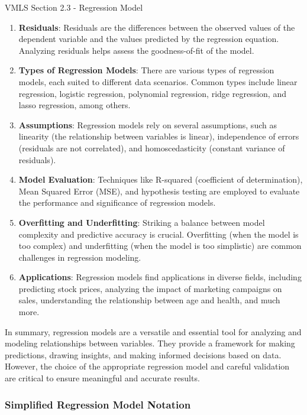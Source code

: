 \begin{notes}{VMLS Section 2.3 - Regression Model}
\begin{enumerate}
        \item \textbf{Residuals}: Residuals are the differences between the observed values of the dependent variable and the values predicted by the regression equation. Analyzing residuals helps assess the goodness-of-fit of the model.
        
        \item \textbf{Types of Regression Models}: There are various types of regression models, each suited to different data scenarios. Common types include linear regression, logistic regression, polynomial regression, ridge regression, and 
        lasso regression, among others.
        
        \item \textbf{Assumptions}: Regression models rely on several assumptions, such as linearity (the relationship between variables is linear), independence of errors (residuals are not correlated), and homoscedasticity (constant variance of residuals).
        
        \item \textbf{Model Evaluation}: Techniques like R-squared (coefficient of determination), Mean Squared Error (MSE), and hypothesis testing are employed to evaluate the performance and significance of regression models.
        
        \item \textbf{Overfitting and Underfitting}: Striking a balance between model complexity and predictive accuracy is crucial. Overfitting (when the model is too complex) and underfitting (when the model is too simplistic) are common challenges 
        in regression modeling.
        
        \item \textbf{Applications}: Regression models find applications in diverse fields, including predicting stock prices, analyzing the impact of marketing campaigns on sales, understanding the relationship between age and health, and much more.
    \end{enumerate}
    
    In summary, regression models are a versatile and essential tool for analyzing and modeling relationships between variables. They provide a framework for making predictions, drawing insights, and making informed decisions based on data. However, the choice 
    of the appropriate regression model and careful validation are critical to ensure meaningful and accurate results.

    \subsubsection*{Simplified Regression Model Notation}


\end{notes}

